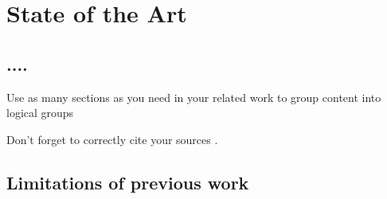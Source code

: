 \documentclass[../thesis.tex]{subfiles}
\begin{document}
    \chapter{State of the Art}

    \section{....}
    Use as many sections as you need in your related work to group content into logical groups

    Don't forget to correctly cite your sources \cite{art1}.
    \section{Limitations of previous work}
\end{document}
